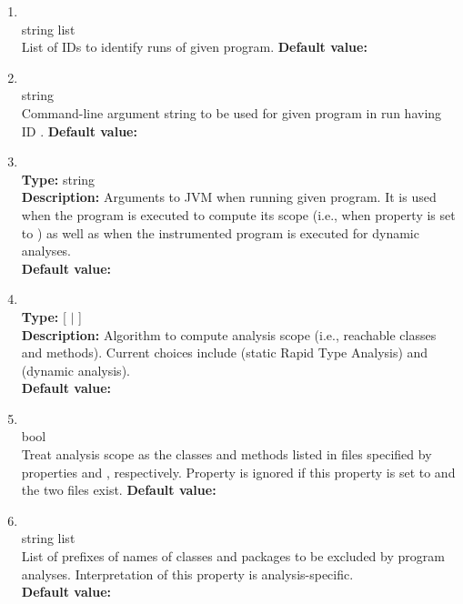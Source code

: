 \begin{enumerate}
\item
{} \\
 string list \\
 List of IDs to identify runs of given program.
{\bf Default value:}  

\item
{} \\
 string \\
 Command-line argument string to be used for given
program in run having ID .
{\bf Default value:} 

\item
{} \\
{\bf Type:} string \\
{\bf Description:} Arguments to JVM when running given program.  It is used when the program is executed to compute its scope (i.e., when property  is set to ) as well as when the instrumented program is executed for dynamic analyses. \\
{\bf Default value:} 

\item
{} \\
{\bf Type:} [ $|$ ] \\
{\bf Description:} Algorithm to compute analysis scope (i.e., reachable classes and methods).  Current choices include  (static Rapid Type Analysis) and  (dynamic analysis). \\
{\bf Default value:} 

\item
{} \\
 bool \\
 Treat analysis scope as the classes and methods listed
in files specified by properties  and ,
respectively. Property  is ignored if this property is set to
 and the two files exist.
{\bf Default value:}  

\item
{} \\
 string list \\
 List of prefixes of names of classes and
packages to be excluded by program analyses.
Interpretation of this property is analysis-specific. \\
{\bf Default value:}  \\


\end{enumerate}
